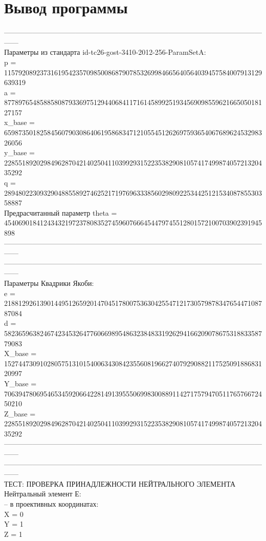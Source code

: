 \documentclass[a4paper,12pt]{article}
\begin{document}
	\section{Вывод программы}
	------------------------------------------------------------------------------------------------------------------\\
	Параметры из стандарта id-tc26-gost-3410-2012-256-ParamSetA:\\
	p = 115792089237316195423570985008687907853269984665640564039457584007913129639319\\
	a = 87789765485885808793369751294406841171614589925193456909855962166505018127157\\
	x\_base = 65987350182584560790308640619586834712105545126269759365406768962453298326056\\
	y\_base = 22855189202984962870421402504110399293152235382908105741749987405721320435292\\
	q = 28948022309329048855892746252171976963338560298092253442512153408785530358887\\
	
	Предрасчитанный параметр theta = 454069018412434321972378083527459607666454479745512801572100703902391945898\\
	------------------------------------------------------------------------------------------------------------------\\
	
	------------------------------------------------------------------------------------------------------------------\\
	Параметры Квадрики Якоби:\\
	e = 21881292613901449512659201470451780075363042554712173057987834765447108787084\\
	d = 58236596382467423453264776066989548632384833192629416620907867531883358779083\\
	X\_base = 15274473091028057513101540063430842355608196627407929088211752509188683120997\\
	Y\_base = 70639478069546534592066422814913955506998300889114271757947051176576672450210\\
	Z\_base = 22855189202984962870421402504110399293152235382908105741749987405721320435292\\
	------------------------------------------------------------------------------------------------------------------\\
	
	------------------------------------------------------------------------------------------------------------------\\
	ТЕСТ: ПРОВЕРКА ПРИНАДЛЕЖНОСТИ НЕЙТРАЛЬНОГО ЭЛЕМЕНТА\\
	Нейтральный элемент Е:\\
	– в проективных координатах:\\
	X = 0\\
	Y = 1\\
	Z = 1\\
	
\end{document}
